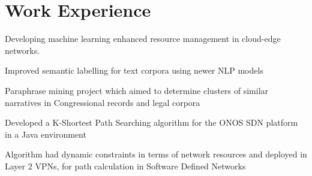 \documentclass[]{onepage}
\begin{document}
\begin{minipage}[t]{0.66\textwidth}



\section{Work Experience}

\vspace{0.4cm}
\begin{tightemize}
\item Developing machine learning enhanced resource management in cloud-edge networks.
\end{tightemize}

\vspace{0.1cm}
\begin{tightemize}
\item Improved semantic labelling for text corpora using newer NLP models
\item Paraphrase mining project which aimed to determine clusters of similar narratives in Congressional records and legal corpora
\end{tightemize}
\vspace{0.1cm}

\vspace{0.07cm} %
\begin{tightemize}
\item Developed a K-Shortest Path Searching algorithm for the ONOS SDN platform in a Java environment
\item Algorithm had dynamic constraints in terms of network resources  and deployed in Layer 2 VPNs, for path calculation in Software Defined Networks
\end{tightemize}
\vspace{0.1cm}


\end{minipage}
\end{document}
